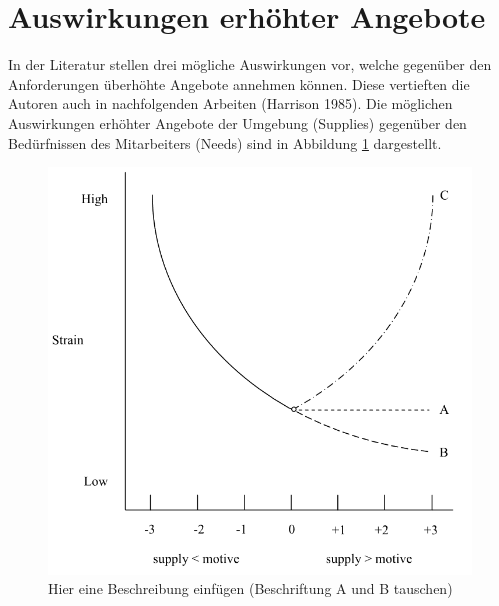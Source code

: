 \section{Auswirkungen erhöhter Angebote}
\label{ch:personEnvironmentFit:auswirkungenErhoehterAngebote}
In der Literatur stellen \textcite{mechanismsOfJobStressAndStrain:1982} drei mögliche Auswirkungen vor, welche gegenüber den Anforderungen überhöhte Angebote annehmen können. Diese vertieften die Autoren auch in nachfolgenden Arbeiten \cite[S. 5f.]{caplan:1987}\cite{harrison:1978}(Harrison 1985). Die möglichen Auswirkungen erhöhter Angebote der Umgebung (Supplies) gegenüber den Bedürfnissen des Mitarbeiters (Needs) sind in Abbildung \ref{fig:personEnvironmentFit:auswirkungenErhoehterAngebote:abb1} dargestellt. \\
\begin{figure}[h]
	\centering
	\includegraphics[width=1\textwidth]{gfx/ueberschuss_supply_motive.png}
	\caption{Hier eine Beschreibung einfügen (Beschriftung A und B tauschen) \cite[S. 23]{edwards:2008}}
	\label{fig:personEnvironmentFit:auswirkungenErhoehterAngebote:abb1}
\end{figure}
\\
